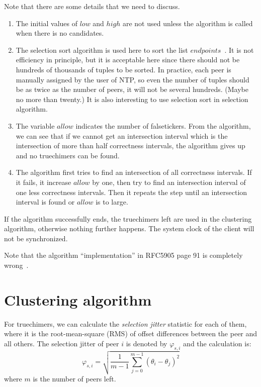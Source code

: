 Note that there are some details that we need to discuss. 
\begin{enumerate}
    \item 
        The initial values of $low$ and $high$ are not used unless the
        algorithm is called when there is no candidates.
    \item 
        The selection sort algorithm is used here to sort the list
        $endpoints$~\cite{source_code}. It is not efficiency in principle, but
        it is acceptable here since there should not be hundreds of thousands
        of tuples to be sorted. In practice, each peer is manually assigned by
        the user of NTP, so even the number of tuples should be as twice as the
        number of peers, it will not be several hundreds. (Maybe no more than
        twenty.) It is also interesting to use selection sort in selection
        algorithm.
    \item
        The variable $allow$ indicates the number of falsetickers. From the
        algorithm, we can see that if we cannot get an intersection interval
        which is the intersection of more than half correctness intervals,
        the algorithm gives up and no truechimers can be
        found.~\cite{clock_selection}
    \item
        The algorithm first tries to find an intersection of all correctness
        intervals. If it fails, it increase $allow$ by one, then try to find
        an intersection interval of one less correctness intervals. Then it
        repeats the step until an intersection interval is found or $allow$
        is to large.
\end{enumerate}
If the algorithm successfully ends, the truechimers left are used in the
clustering algorithm, otherwise nothing further happens.  The system clock of
the client will not be synchronized.

Note that the algorithm ``implementation'' in RFC5905 page 91 is completely
wrong~\cite{rfc5905}.


\section{Clustering algorithm}%
\label{sec:clustering_algorithm}
For truechimers, we can calculate the \emph{selection jitter} statistic for
each of them, where it is the root-mean-square (RMS) of offset differences
between the peer and all others. The selection jitter of peer $i$ is denoted by
$\varphi_{s,i}$ and the calculation is:
\begin{equation}
    \varphi_{s,i} = \sqrt{\frac{1}{m-1} \sum^{m-1}_{j=0} (\theta_i -
    \theta_j)^2 }
    \label{eq:selection_jitter}
\end{equation}
where $m$ is the number of peers left.

